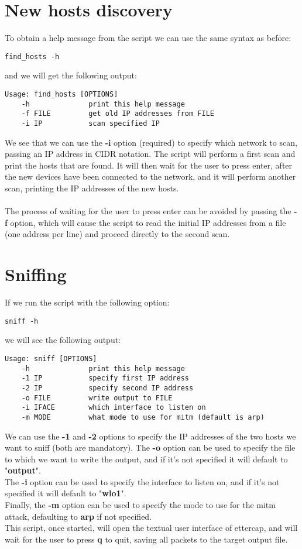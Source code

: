 \section{New hosts discovery}
To obtain a help message from the script we can use the same syntax as before:
\begin{lstlisting}[numbers=none]
    find_hosts -h
\end{lstlisting}
and we will get the following output:
\begin{lstlisting}[numbers=none]
    Usage: find_hosts [OPTIONS]
    -h              print this help message
    -f FILE         get old IP addresses from FILE
    -i IP           scan specified IP
\end{lstlisting}
We see that we can use the \textbf{-i} option (required) to specify which network to scan,
passing an IP address in CIDR notation. The script will perform a first scan and
print the hosts that are found. It will then wait for the user to press enter,
after the new devices have been connected to the network, and it will perform
another scan, printing the IP addresses of the new hosts.\\\\
The process of waiting for the user to press enter can be avoided by passing
the \textbf{-f} option, which will cause the script to read the initial IP addresses
from a file (one address per line) and proceed directly to the second scan.
\section{Sniffing}
If we run the script with the following option:
\begin{lstlisting}[numbers=none]
    sniff -h
\end{lstlisting}
we will see the following output:
\begin{lstlisting}[numbers=none]
    Usage: sniff [OPTIONS]
    -h              print this help message
    -1 IP           specify first IP address
    -2 IP           specify second IP address
    -o FILE         write output to FILE
    -i IFACE        which interface to listen on
    -m MODE         what mode to use for mitm (default is arp)
\end{lstlisting}
We can use the \textbf{-1} and \textbf{-2} options to specify the IP addresses of the
two hosts we want to sniff (both are mandatory). The \textbf{-o} option can be used
to specify the file to which we want to write the output, and if it's not specified
it will default to "\textbf{output}".\\
The \textbf{-i} option can be used to specify the interface to listen on, and if it's
not specified it will default to "\textbf{wlo1}".\\
Finally, the \textbf{-m} option can be used to specify the mode to use for the mitm
attack, defaulting to \textbf{arp} if not specified.\\
This script, once started, will open the textual user interface of ettercap,
and will wait for the user to press \textbf{q} to quit, saving all packets
to the target output file.\\
\newpage
